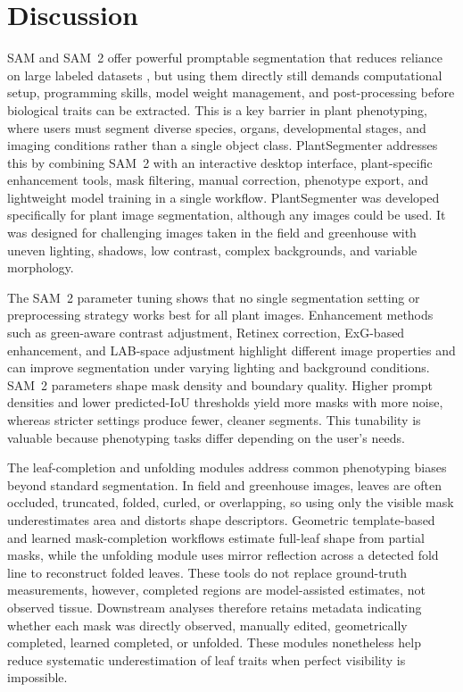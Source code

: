 \documentclass[12pt, a4paper]{article}
\begin{document}
\section{Discussion}
\label{sec:discussion}

SAM and SAM~2 offer powerful promptable segmentation that reduces reliance on large labeled datasets \citep{kirillov2023segment,ravi2025sam2}, but using them directly still demands computational setup, programming skills, model weight management, and post-processing before biological traits can be extracted. This is a key barrier in plant phenotyping, where users must segment diverse species, organs, developmental stages, and imaging conditions rather than a single object class. PlantSegmenter addresses this by combining SAM~2 with an interactive desktop interface, plant-specific enhancement tools, mask filtering, manual correction, phenotype export, and lightweight model training in a single workflow. PlantSegmenter was developed specifically for plant image segmentation, although any images could be used. It was designed for challenging images taken in the field and greenhouse with uneven lighting, shadows, low contrast, complex backgrounds, and variable morphology.

The SAM~2 parameter tuning shows that no single segmentation setting or preprocessing strategy works best for all plant images. Enhancement methods such as green-aware contrast adjustment, Retinex correction, ExG-based enhancement, and LAB-space adjustment highlight different image properties and can improve segmentation under varying lighting and background conditions. SAM~2 parameters shape mask density and boundary quality. Higher prompt densities and lower predicted-IoU thresholds yield more masks with more noise, whereas stricter settings produce fewer, cleaner segments. This tunability is valuable because phenotyping tasks differ depending on the user's needs.

The leaf-completion and unfolding modules address common phenotyping biases beyond standard segmentation. In field and greenhouse images, leaves are often occluded, truncated, folded, curled, or overlapping, so using only the visible mask underestimates area and distorts shape descriptors. Geometric template-based and learned mask-completion workflows estimate full-leaf shape from partial masks, while the unfolding module uses mirror reflection across a detected fold line to reconstruct folded leaves. These tools do not replace ground-truth measurements, however, completed regions are model-assisted estimates, not observed tissue. Downstream analyses therefore retains metadata indicating whether each mask was directly observed, manually edited, geometrically completed, learned completed, or unfolded. These modules nonetheless help reduce systematic underestimation of leaf traits when perfect visibility is impossible.
\end{document}
